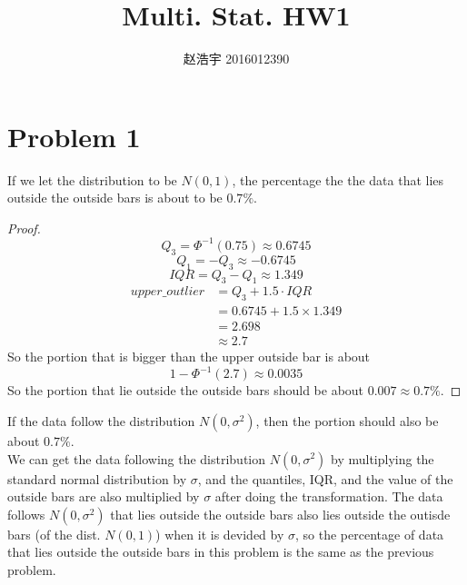 \documentclass{article}
\title{\textbf{Multi. Stat. HW1}}
\author{赵浩宇 2016012390}
\date{}
\begin{document}
\begin{CJK}{UTF8}{gbsn}
  \maketitle
\end{CJK}

\section{Problem 1}
If we let the distribution to be $N(0,1)$, the percentage the the data that lies outside the outside bars is about to be $0.7\%$.
\begin{proof}
  \begin{equation*}
    Q_3  = \Phi^{-1}\left(0.75\right)
        \approx 0.6745
  \end{equation*}
  \begin{equation*}
    Q_1  = -Q_3
         \approx -0.6745
  \end{equation*}
  \begin{equation*}
    IQR  = Q_3 - Q_1
         \approx 1.349
  \end{equation*}
  \begin{align*}
    upper\_outlier  &= Q_3 + 1.5 \cdot IQR\\
                    &= 0.6745 + 1.5 \times 1.349\\
                    &= 2.698\\
                    &\approx 2.7
  \end{align*}
  So the portion that is bigger than the upper outside bar is about
  \begin{equation*}
    1 - \Phi^{-1}\left(2.7\right) \approx 0.0035
  \end{equation*}
  So the portion that lie outside the outside bars should be about $0.007 \approx 0.7\%$.
\end{proof}
If the data follow the distribution $N(0, \sigma^2)$, then the portion should also be about $0.7\%$.\\
 We can get the data following the distribution $N(0,\sigma^2)$ by multiplying the standard normal distribution by $\sigma$, and the quantiles, IQR, and the value of the outside bars are also multiplied by $\sigma$ after doing the transformation. The data follows $N(0,\sigma^2)$ that lies outside the outside bars also lies outside the outisde bars (of the dist. $N(0,1)$) when it is devided by $\sigma$, so the percentage of data that lies outside the outside bars in this problem is the same as the previous problem.
\clearpage
\end{document}
